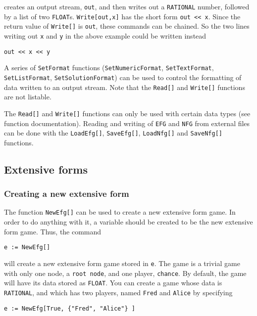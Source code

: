 \noindent
creates an output stream, \verb+out+, and then writes out a
\verb+RATIONAL+ number, followed by a list of two \verb+FLOAT+s.
\verb+Write[out,x]+ has the short form \verb+out << x+.  Since the
return value of \verb+Write[]+ is \verb+out+, these commands can be
chained.  So the two lines writing out \verb+x+ and \verb+y+ in the
above example could be written instead

\begin{verbatim}
out << x << y
\end{verbatim}
 
A series of \verb+SetFormat+ functions (\verb+SetNumericFormat+,
\verb+SetTextFormat+, \verb+SetListFormat+, \verb+SetSolutionFormat+)
can be used to control the formatting of data written to an output
stream.  Note that the \verb+Read[]+ and \verb+Write[]+ functions are
not listable.

The \verb+Read[]+ and \verb+Write[]+ functions can only be used with
certain data types (see function documentation).  Reading and writing
of \verb+EFG+ and \verb+NFG+ from external files can be done with the
\verb+LoadEfg[]+, \verb+SaveEfg[]+, \verb+LoadNfg[]+ and
\verb+SaveNfg[]+ functions.

\subsection{Extensive forms}

\subsubsection{Creating a new extensive form}

The function {\tt NewEfg[]} can be used to create a new extensive form
game.  In order to do anything with it, a variable should be created
to be the new extensive form game.  Thus, the command

\begin{verbatim}
e := NewEfg[]
\end{verbatim}

\noindent will create a new extensive form game stored in \verb+e+.
The game is a trivial game with only one node, a \verb+root node+, and
one player, \verb+chance+.  By default, the game will have its data
stored as \verb+FLOAT+.  You can create a game whose data is
\verb+RATIONAL+, and which has two players, named \verb+Fred+ and
\verb+Alice+ by specifying


\begin{verbatim}
e := NewEfg[True, {"Fred", "Alice"} ]
\end{verbatim}

